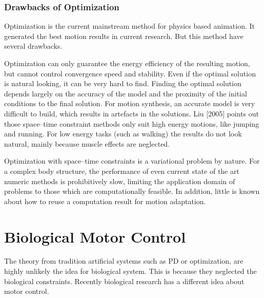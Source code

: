 \subsubsection*{Drawbacks of Optimization}
Optimization is the current mainstream method for physics based animation.
It generated the best motion results in current research.
But this method have several drawbacks.

\begin{itemize}
Optimization can only guarantee the energy efficiency of the resulting motion, but cannot control convergence speed and stability.
Even if the optimal solution is natural looking, it can be very hard to find. Finding the optimal solution depends largely on the accuracy of the model and the proximity of the initial conditions to the final solution. For motion synthesis, an accurate model is very difficult to build, which results in artefacts in the solutions. Liu [2005] points out those space–time constraint methods only suit high energy motions, like jumping and running.
For low energy tasks (such as walking) the results do not look natural, mainly because muscle effects are neglected.

Optimization with space–time constraints is a variational problem by nature. For a complex body structure, the performance of even current state of the art numeric methods is prohibitively slow, limiting the application domain of problems to those which are computationally feasible. In addition, little is known about how to reuse a computation result for motion adaptation.

\end{itemize}


\section{Biological Motor Control}
The theory from tradition artificial systems such as PD or optimization, are highly unlikely the idea for biological system. 
This is because they neglected the biological constraints.
Recently biological research has a different idea about motor control.

